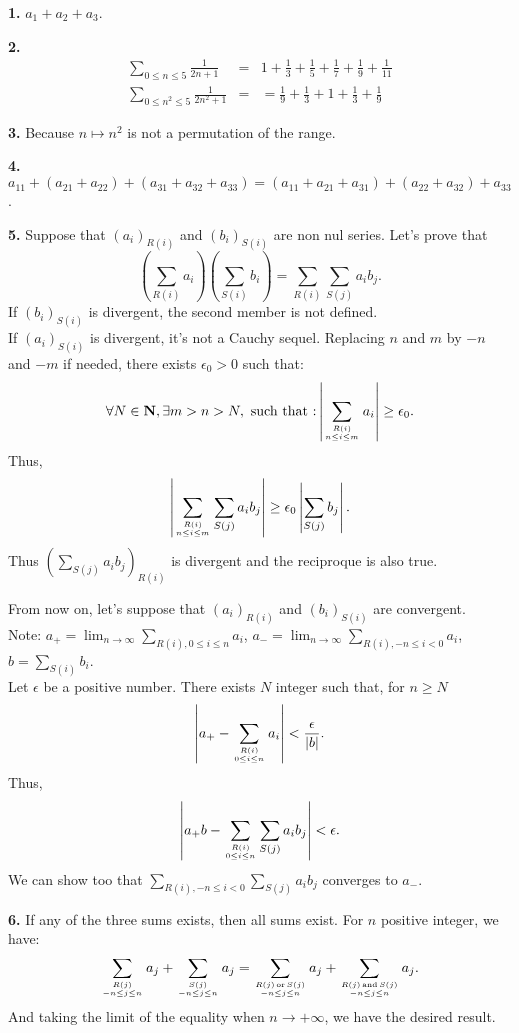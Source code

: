 \documentclass[a4paper,12pt]{article}
\newcommand{\newpar}[1]{\bigskip \noindent \textbf{#1.}}
\newcommand{\ra}{\rightarrow}
\begin{document}
\newpar{1} $a_1 + a_2 + a_3$.

\newpar{2}
\begin{eqnarray*}
\sum_{0 \le n \le 5}\frac{1}{2n+1} & = & 1 + \frac{1}{3} + \frac{1}{5} +
\frac{1}{7} + \frac{1}{9} + \frac{1}{11} \\
\sum_{0 \le n^2 \le 5} \frac{1}{2n^2+1} & = & = \frac{1}{9}+
\frac{1}{3} + 1 + \frac{1}{3} +
\frac{1}{9}
\end{eqnarray*}

\newpar{3} Because $n \mapsto n^2$ is not a permutation of the range.

\newpar{4} $a_{11} + (a_{21} + a_{22}) + (a_{31} + a_{32} + a_{33}) =
(a_{11} + a_{21} + a_{31}) + (a_{22} + a_{32}) + a_{33}$.

\newpar{5} Suppose that $(a_i)_{R(i)}$ and $(b_i)_{S(i)}$ are non nul
series. Let's prove that
\[
\left(\sum_{R(i)}a_i\right)\left(\sum_{S(i)}b_i\right) = \sum_{R(i)}
\sum_{S(j)}a_i b_j.\] 
If $(b_i)_{S(i)}$ is divergent, the second member is not defined.\\
If $(a_i)_{S(i)}$ is divergent, it's not a Cauchy sequel.
Replacing $n$ and $m$ by $-n$ and $-m$ if needed, there exists 
$\epsilon_0 > 0$ such that:
\[ \forall N \in \mathbf{N}, \exists m > n > N, \mbox{ such that :}
\left|\sum_{R(i) \atop n\le i\le m}a_i\right| \ge \epsilon_0. \] Thus,
\[ \left| \sum_{R(i) \atop n\le i\le m} \sum_{S(j)} a_i b_j \right|
\ge \epsilon_0 \left|\sum_{S(j)}b_j\right|.\]
Thus $\left(\sum_{S(j)}a_i b_j\right)_{R(i)}$ is divergent and the reciproque
is also true.

\medskip
From now on, let's suppose that $(a_i)_{R(i)}$ and $(b_i)_{S(i)}$ are
convergent.\\
Note: $a_+ = \lim_{n \ra \infty}\sum_{R(i), 0 \le i \le n}a_i$,
$a_- = \lim_{n\ra \infty}\sum_{R(i),-n\le i<0}a_i$, $b = \sum_{S(i)}b_i$.\\
Let $\epsilon$ be a positive number.  There exists $N$ integer such
that, for $n \ge N$
\[\left| a_+ - \sum_{R(i)\atop 0 \le i \le n}a_i \right| < \frac{\epsilon}{|b|}.\]
Thus,
\[\left| a_+b - \sum_{R(i)\atop 0\le i\le n}\sum_{S(j)}a_ib_j\right| <
\epsilon.\]
We can show too that $\sum_{R(i),-n\le i< 0}\sum_{S(j)}a_ib_j$
converges to $a_-$.

\newpar{6} If any of the three sums exists, then all sums exist.  For
$n$ positive integer, we have:
\[\sum_{R(j)\atop-n\le j\le n}a_j + \sum_{S(j)\atop-n\le j\le n}a_j =
\sum_{R(j)\,\mathrm{or}\,S(j)\atop-n\le j\le n}a_j + 
\sum_{R(j)\,\mathrm{and}\,S(j)\atop-n \le j \le n}a_j.\]
And taking the limit of the equality when $n \ra +\infty$, we have the
desired result.
\end{document}
